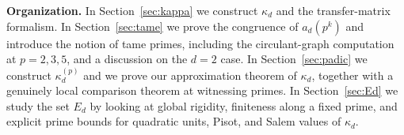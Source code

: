 \documentclass{article}
\theoremstyle{plain}
\theoremstyle{definition}
\theoremstyle{remark}
\newtheorem*{introthm}{Theorem}
\newcommand{\Q}{\mathbb{Q}}
\begin{document}





\medskip
\noindent\textbf{Organization.} In Section~\ref{sec:kappa} we construct $\kappa_d$ and the transfer-matrix formalism. In Section~\ref{sec:tame} we prove the congruence of $a_d(p^k)$ and introduce the notion of tame primes, including the circulant-graph computation at $p=2,3,5$, and a discussion on the $d=2$ case. In Section~\ref{sec:padic} we construct $\kappa_d^{(p)}$ and we prove our approximation theorem of $\kappa_d$, together with a genuinely local comparison theorem at witnessing primes. In Section~\ref{sec:Ed} we study the set $E_d$ by looking at global rigidity, finiteness along a fixed prime, and explicit prime bounds for quadratic units, Pisot, and Salem values of $\kappa_d$.
\end{document}
